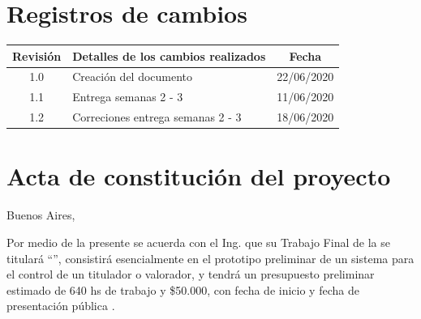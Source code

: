 \documentclass[11pt]{charter}
\begin{document}
\maketitle
\thispagestyle{empty}
\pagebreak


\thispagestyle{empty}
{\setlength{\parskip}{0pt}
\tableofcontents{}
}
\pagebreak


\section{Registros de cambios}
\label{sec:registro}


\begin{table}[ht]
\label{tab:registro}
\centering

\begin{tabularx}{\linewidth}{@{}|c|X|c|@{}}
\hline
\rowcolor[HTML]{C0C0C0} 
\hline
Revisión & \multicolumn{1}{c|}{\cellcolor[HTML]{C0C0C0}Detalles de los cambios realizados} & Fecha      \\ \hline
1.0      & Creación del documento                                                          & 22/06/2020 \\ \hline
1.1      & Entrega semanas 2 - 3                                         & 11/06/2020 \\ 
\hline
1.2      & Correciones entrega semanas 2 - 3 & 18/06/2020  \\
\hline
\end{tabularx}
\end{table}

\pagebreak



\section{Acta de constitución del proyecto}
\label{sec:acta}

\begin{flushright}
Buenos Aires, \fechaInicioName
\end{flushright}

\vspace{2cm}

Por medio de la presente se acuerda con el Ing. \authorname\hspace{1px} que su Trabajo Final de la \degreename\hspace{1px} se titulará ``\ttitle'', consistirá esencialmente en el prototipo preliminar de un sistema para el control de un titulador o valorador, y tendrá un presupuesto preliminar estimado de 640 hs de trabajo y \$50.000, con fecha de inicio \fechaInicioName\hspace{1px} y fecha de presentación pública \fechaFinalName.
\end{document}
